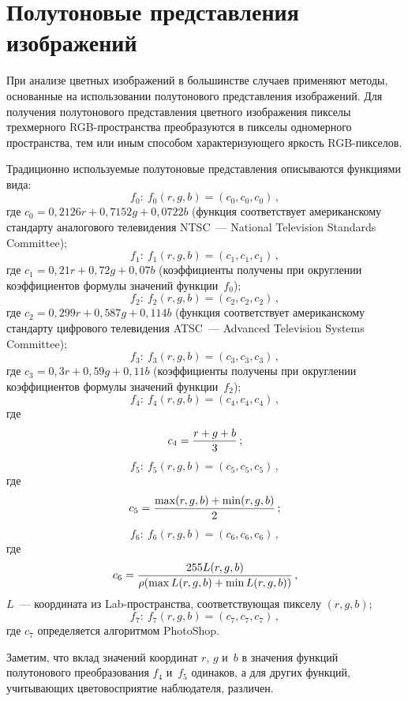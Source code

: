 \begin{multicols}{2}

\label{st\stat}

\section{Полутоновые представления изображений}

  При анализе цветных изображений в большинстве случаев применяют
методы, основанные на использо\-вании полутонового представления
изоб\-ра\-же\-ний. Для получения полутонового представления цветного
изображения пикселы трехмерного RGB-про\-стран\-ст\-ва преобразуются в
пикселы одномерного пространства, тем или иным способом
характеризующего яркость RGB-пик\-се\-лов.

  Традиционно используемые полутоновые представления описываются
функциями вида:
  $$
  f_0:\ f_0(r, g, b) = (c_0, c_0, c_0)\,,
  $$
  где $c_0 = 0{,}2126r + 0{,}7152g + 0{,}0722b$ (функция соответствует
американскому стандарту аналогового телевидения NTSC~--- National Television
Standards Committee);
  $$
  f_1:\ f_1(r, g, b) = (c_1, c_1, c_1)\,,
  $$
   где $c_1 = 0{,}21r + 0{,}72g + 0{,}07b$ (коэффициенты получены при
округлении коэффициентов формулы значений функции~$f_0$);
  $$
  f_2:\ f_2(r, g, b) = (c_2, c_2, c_2)\,,
  $$
  где $c_2 = 0{,}299r + 0{,}587g + 0{,}114b$ (функция соответствует
американскому стандарту цифрового телевидения ATSC~--- Advanced Television
Systems Committee);
  $$
  f_3:\ f_3(r, g, b) = (c_3, c_3, c_3)\,,
  $$
где  $c_3 = 0{,}3r + 0{,}59g + 0{,}11b$ (коэффициенты получены при округлении
коэффициентов формулы значений функции~$f_2$);
  $$
  f_4:\ f_4(r, g, b) = (c_4, c_4, c_4)\,,$$
  где
  $$c_4 = \displaystyle\frac{\displaystyle r+g+b\mathstrut}{\displaystyle 3\mathstrut}\,;$$
  $$
  f_5:\ f_5(r, g, b) = (c_5, c_5, c_5)\,,$$
  где
  $$c_5=\displaystyle\frac{\displaystyle \max (r,g,b)+\min(r,g,b)\mathstrut}{\displaystyle 2\mathstrut}\,;
  $$
  $$
  f_6:\ f_6(r, g, b) = (c_6, c_6, c_6)\,,
  $$
где
$$
c_6= \displaystyle\frac{\displaystyle 255 L(r,g,b)\mathstrut}{\displaystyle \rho(\max L(r,g,b)+\min L(r,g,b))\mathstrut}\,,
  $$
  $L$~--- координата из Lab-про\-стран\-ст\-ва, соответствующая пикселу
$(r, g, b)$;
  $$
  f_7:\ f_7(r, g, b) = (c_7, c_7, c_7)\,,
  $$
где  $c_7$  определяется алгоритмом PhotoShop.

  Заметим, что вклад значений координат $r$, $g$ и~$b$ в значения функций
полутонового преобразования $f_4$ и~$f_5$ одинаков, а для других функций,
учи\-ты\-ва\-ющих цветовосприятие наблюдателя, различен.


\end{multicols}
